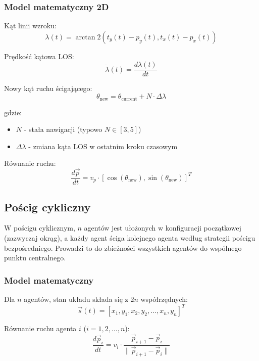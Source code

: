 \documentclass[12pt,a4paper]{article}
\begin{document}
\subsubsection{Model matematyczny 2D}

Kąt linii wzroku:
\begin{equation}
\lambda(t) = \arctan2(t_y(t) - p_y(t), t_x(t) - p_x(t))
\end{equation}

Prędkość kątowa LOS:
\begin{equation}
\dot{\lambda}(t) = \frac{d\lambda(t)}{dt}
\end{equation}

Nowy kąt ruchu ścigającego:
\begin{equation}
\theta_{\text{new}} = \theta_{\text{current}} + N \cdot \Delta\lambda
\end{equation}

gdzie:
\begin{itemize}
    \item $N$ - stała nawigacji (typowo $N \in [3, 5]$)
    \item $\Delta\lambda$ - zmiana kąta LOS w ostatnim kroku czasowym
\end{itemize}

Równanie ruchu:
\begin{equation}
\frac{d\vec{p}}{dt} = v_p \cdot [\cos(\theta_{\text{new}}), \sin(\theta_{\text{new}})]^T
\end{equation}

\subsection{Pościg cykliczny}

W pościgu cyklicznym, $n$ agentów jest ułożonych w konfiguracji początkowej (zazwyczaj okrąg), a każdy agent ściga kolejnego agenta według strategii pościgu bezpośredniego. Prowadzi to do zbieżności wszystkich agentów do wspólnego punktu centralnego.

\subsubsection{Model matematyczny}

Dla $n$ agentów, stan układu składa się z $2n$ współrzędnych:
\begin{equation}
\vec{s}(t) = [x_1, y_1, x_2, y_2, \ldots, x_n, y_n]^T
\end{equation}

Równanie ruchu agenta $i$ ($i = 1, 2, \ldots, n$):
\begin{equation}
\frac{d\vec{p}_i}{dt} = v_i \cdot \frac{\vec{p}_{i+1} - \vec{p}_i}{\|\vec{p}_{i+1} - \vec{p}_i\|}
\end{equation}
\end{document}

